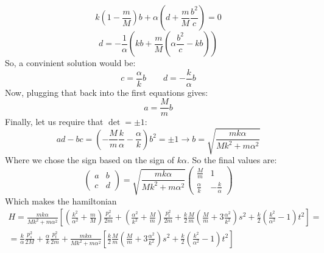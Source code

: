 \documentclass{article}
\begin{document}
\begin{equation}
    k\left(1 - \frac{m}{M}\right)b + \alpha \left(d + \frac{m}{M}\frac{b^2}{c}\right) = 0
\end{equation}
\begin{equation}
    d = - \frac{1}{\alpha}\left(kb + \frac{m}{M}\left(\alpha\frac{b^2}{c}- kb\right)\right)
\end{equation}
So, a convinient solution would be:
\begin{equation}
    c = \frac{\alpha}{k}b
    \qquad
    d = -\frac{k}{\alpha}b
\end{equation}
Now, plugging that back into the first equations gives:
\begin{equation}
    a = \frac{M}{m}b
\end{equation}
Finally, let us require that $\det = \pm1$:
\begin{equation}
    ad - bc = \left(-\frac{M}{m}\frac{k}{\alpha} - \frac{\alpha}{k}\right)b^2 = \pm1
    \rightarrow
    b = \sqrt{\frac{mk\alpha}{Mk^2 + m\alpha^2}}
\end{equation}
Where we chose the sign based on the sign of $k\alpha$. So the final values are:
\begin{equation}
    \begin{pmatrix}
        a & b \\ c & d
    \end{pmatrix} = \sqrt{\frac{mk\alpha}{Mk^2 + m\alpha^2}}\begin{pmatrix}
        \frac{M}{m} & 1 \\ \frac{\alpha}{k} & -\frac{k}{\alpha}
    \end{pmatrix}
\end{equation}
Which makes the hamiltonian
\begin{equation}
\begin{gathered}
    H =
    \frac{mk\alpha}{Mk^2 + m\alpha^2}\left[
        \left(\frac{k^2}{\alpha^2} + \frac{m}{M}\right)\frac{p_s^2}{2m}
        + \left(\frac{\alpha^2}{k^2} + \frac{M}{m}\right)\frac{p_t^2}{2m}
        + \frac{k}{2}\frac{M}{m}\left(\frac{M}{m} + 3\frac{\alpha^2}{k^2}\right)s^2
        + \frac{k}{2}\left(\frac{k^2}{\alpha^2} - 1\right)t^2
    \right] = \\ =
    \frac{k}{\alpha}\frac{p_s^2}{2M}
    + \frac{\alpha}{k}\frac{p_t^2}{2m} +
    \frac{mk\alpha}{Mk^2 + m\alpha^2}\left[
        \frac{k}{2}\frac{M}{m}\left(\frac{M}{m} + 3\frac{\alpha^2}{k^2}\right)s^2
        + \frac{k}{2}\left(\frac{k^2}{\alpha^2} - 1\right)t^2
    \right]
\end{gathered}
\end{equation}
\end{document}
